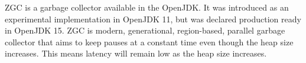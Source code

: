 ZGC is a garbage collector available in the OpenJDK. It was introduced as an experimental implementation in OpenJDK 11, but was declared production ready in OpenJDK 15. ZGC is modern, generational, region-based, parallel garbage collector that aims to keep pauses at a constant time even though the heap size increases. This means latency will remain low as the heap size increases.%

